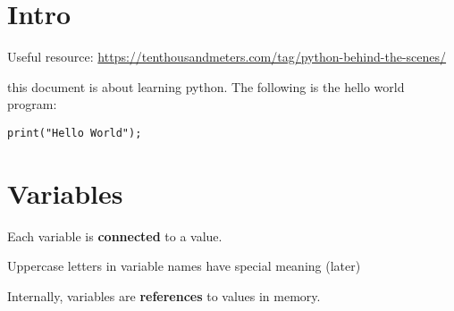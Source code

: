 \documentclass[10pt, openany]{article}
\author{Alessio Tanzi}
\begin{document}
  \section{Intro}
  Useful resource: \url{https://tenthousandmeters.com/tag/python-behind-the-scenes/}\par
  this document is about learning python. The following is the hello
  world program:
  \begin{lstlisting}
print("Hello World");
  \end{lstlisting}

  \section{Variables}
  Each variable is \textbf{connected} to a value.\par
  Uppercase letters in variable names have special meaning (later)\par
  Internally, variables are \textbf{references} to values in 
  memory.\par
\end{document}
